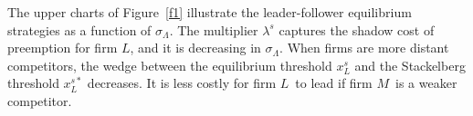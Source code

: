 \documentclass[nogrid,nosurname,sort&compress]{RFS}
\begin{document}

The upper charts of Figure~\ref{f1} illustrate the leader-follower equilibrium strategies as a
function of $\sigma _{\Lambda }$. The multiplier $\lambda ^{s}$ captures the shadow cost of
preemption for firm $L$, and it is decreasing in $\sigma _{\Lambda }$. When firms are more
distant competitors, the wedge between the equilibrium threshold $x_{L}^{s}$ and the Stackelberg
threshold $x_{L}^{s\ast }$ decreases. It is less costly for firm $L$\ to lead if firm $M$\ is a
weaker competitor.


\end{document}
